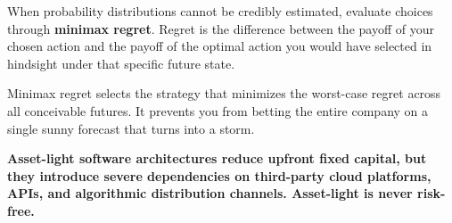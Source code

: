 When probability distributions cannot be credibly estimated, evaluate choices through \textbf{minimax regret}. Regret is the difference between the payoff of your chosen action and the payoff of the optimal action you would have selected in hindsight under that specific future state.

Minimax regret selects the strategy that minimizes the worst-case regret across all conceivable futures. It prevents you from betting the entire company on a single sunny forecast that turns into a storm.

\textbf{Asset-light software architectures reduce upfront fixed capital, but they introduce severe dependencies on third-party cloud platforms, APIs, and algorithmic distribution channels. Asset-light is never risk-free.}
